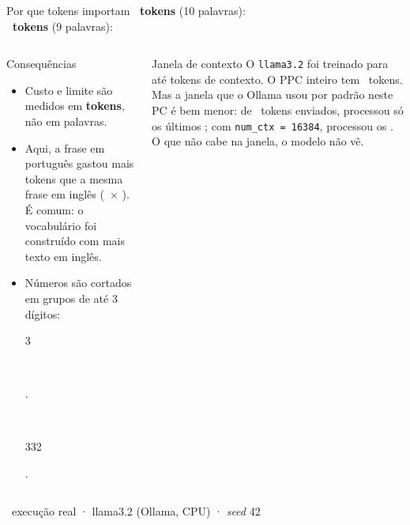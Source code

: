 \documentclass[aspectratio=169]{beamer}
\newcommand{\tk}[1]{{\setlength{\fboxsep}{1.6pt}\colorbox{mineblue!12}{\strut\ttfamily\footnotesize #1}}}
\newcommand{\real}{\textcolor{minegreen}{\tiny\faIcon{flask}\ execução real · llama3.2 (Ollama, CPU) · \textit{seed} 42}}
\begin{document}
\begin{frame}[shrink=6]{Por que tokens importam}
    \footnotesize
    \textbf{\ntokB\ tokens} (10 palavras):\ \tokB\\[4pt]
    \textbf{\ntokC\ tokens} (9 palavras):\ \tokC\\[6pt]
    \pause
    \begin{columns}
        \begin{block}{Consequências}
            \begin{itemize}\footnotesize
                \item Custo e limite são medidos em \textbf{tokens}, não em palavras.
                \item Aqui, a frase em português gastou mais tokens que a mesma frase em inglês (\ntokB\ $\times$ \ntokC). É comum: o vocabulário foi construído com mais texto em inglês.
                \item Números são cortados em grupos de até 3 dígitos: \tk{3}\,\tk{.}\,\tk{332}.
            \end{itemize}
        \end{block}
        \begin{block}{Janela de contexto}
            \footnotesize O \texttt{llama3.2} foi treinado para até \textbf{\vCTX} tokens de contexto. O PPC inteiro tem \vPPCtok\ tokens. Mas a janela que o Ollama usou por padrão neste PC é bem menor: de \vJENV\ tokens enviados, processou só os últimos \vJPROC; com \texttt{num\_ctx = 16384}, processou os \vJCTX. O que não cabe na janela, o modelo não vê.
        \end{block}
    \end{columns}
    \real
\end{frame}
\end{document}
